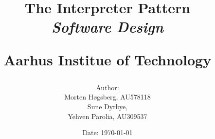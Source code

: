 \newcommand{\authorName}{}
\newcommand{\titleName}{The Interpreter Pattern}
\newcommand{\subject}{Software Design}
\newcommand{\institute}{Aarhus Institue of Technology}
\begin{titlepage}
  \centering
    \title
    {
      \Huge \textbf{\titleName}\\
      \scale{\numberSQRTTWO}{\vspace{\sol pt}}
      \LARGE \textit{\subject}
      \scale{\numberSQRTTWO}{\rule{\linewidth}{\sol pt}}

      \textbf{\institute}
      \author
    {
      \LARGE Author: \\
      Morten Høgsberg, AU578118 \\
      Sune Dyrbye, \\
      Yehven Parolia, AU309537
    }
      \date{\LARGE Date: \today}
    }
\end{titlepage}
